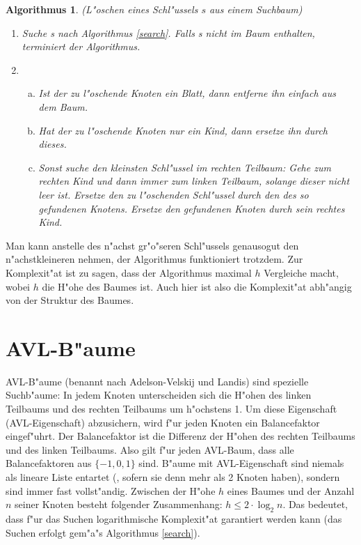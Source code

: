 \documentclass[a4paper,titlepage]{article}
\newtheorem{alg}{Algorithmus}
\begin{document}
\begin{appendix}
\newpage
\begin{alg} \label{delete}
(L"oschen eines Schl"ussels $s$ aus einem Suchbaum)
\begin{enumerate}[1.]
\item Suche s nach Algorithmus \ref{search}. Falls s nicht im Baum
enthalten, terminiert der Algorithmus.
\item
    \begin{enumerate}[(a)]
    \item Ist der zu l"oschende Knoten ein Blatt, dann entferne ihn
    einfach aus dem Baum.
    \item Hat der zu l"oschende Knoten nur ein Kind, dann ersetze
    ihn durch dieses.
    \item Sonst suche den kleinsten Schl"ussel im rechten
    Teilbaum: Gehe zum rechten Kind und dann immer zum
    linken Teilbaum, solange dieser nicht leer ist. Ersetze den zu
    l"oschenden Schl"ussel durch den des so gefundenen Knotens.
    Ersetze den gefundenen Knoten durch sein rechtes Kind.
    \end{enumerate}
\end{enumerate}
\end{alg}

Man kann anstelle des n"achst gr"o"seren Schl"ussels genausogut den
n"achstkleineren nehmen, der Algorithmus funktioniert trotzdem.
Zur Komplexit"at ist zu sagen, dass der Algorithmus maximal $h$
Vergleiche macht, wobei $h$ die H"ohe des Baumes ist. Auch hier ist
also die Komplexit"at abh"angig von der Struktur des Baumes.





\section{AVL-B"aume}
AVL-B"aume (benannt nach Adelson-Velskij und Landis) sind
spezielle Suchb"aume: In jedem Knoten unterscheiden sich die H"ohen
des linken Teilbaums und des rechten Teilbaums um h"ochstens 1. Um
diese Eigenschaft (AVL-Eigenschaft) abzusichern, wird f"ur jeden
Knoten ein Balancefaktor eingef"uhrt. Der Balancefaktor ist die
Differenz der H"ohen des rechten Teilbaums und des linken
Teilbaums. Also gilt f"ur jeden AVL-Baum, dass alle
Balancefaktoren aus $\{-1,0,1\}$ sind. B"aume mit AVL-Eigenschaft
sind niemals als lineare Liste entartet (, sofern sie denn mehr als
2 Knoten haben), sondern sind immer fast
vollst"andig. Zwischen der H"ohe $h$ eines Baumes und der Anzahl $n$
seiner Knoten besteht folgender Zusammenhang: $h\leq 2 \cdot
\log_2{n}$. Das bedeutet, dass f"ur das Suchen logarithmische
Komplexit"at garantiert werden kann (das Suchen erfolgt gem"a"s
Algorithmus \ref{search}). 



\end{appendix}
\end{document}

